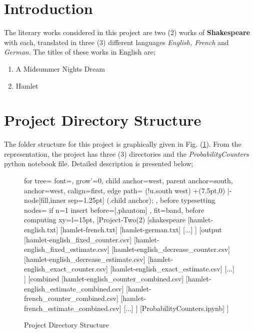 \documentclass[longpaper, english, final, times]{revdetua}
\begin{document}
	
	\section{Introduction}
		The literary works considered in this project are two (2) works of \textbf{Shakespeare} with each, translated in three (3) different languages \textit{English, French} and \textit{German}.
		The titles of these works in English are;
		\begin{enumerate}
			\item A Midsummer Nights Dream
			\item Hamlet
		\end{enumerate}
	
		
	\section{Project Directory Structure}
		The folder structure for this project is graphically given in Fig. (\ref{figure:projectDirectoryStructure}). 
		From the representation, the project has three (3) directories and the \textit{ProbabilityCounters} python notebook file. Detailed description is presented below;
		\begin{figure}[!ht]
			\begin{center}
				\begin{forest}
					for tree={
						font=\ttfamily,
						grow'=0,
						child anchor=west,
						parent anchor=south,
						anchor=west,
						calign=first,
						edge path={
							\noexpand{}
							(!u.south west) +(7.5pt,0) |- node[fill,inner sep=1.25pt] {} (.child anchor);
						},
						before typesetting nodes={
							if n=1
							{insert before={[,phantom]}}
							{}
						},
						fit=band,
						before computing xy={l=15pt},
					}
					[Project-Two(2)
					[shakespeare
					[hamlet-english.txt]
					[hamlet-french.txt]
					[hamlet-german.txt]
					[...]
					]
					[output
					[hamlet-english\_fixed\_counter.csv]
					[hamlet-english\_fixed\_estimate.csv]
					[hamlet-english\_decrease\_counter.csv]
					[hamlet-english\_decrease\_estimate.csv]
					[hamlet-english\_exact\_counter.csv]
					[hamlet-english\_exact\_estimate.csv]
					[...]
					]
					[combined
					[hamlet-english\_counter\_combined.csv]
					[hamlet-english\_estimate\_combined.csv]
					[hamlet-french\_counter\_combined.csv]
					[hamlet-french\_estimate\_combined.csv]
					[...]
					]
					[ProbabilityCounters.ipynb]
					]
				\end{forest}
			\end{center}
			\caption{Project Directory Structure}
			\label{figure:projectDirectoryStructure}
		\end{figure}
		
\end{document}
